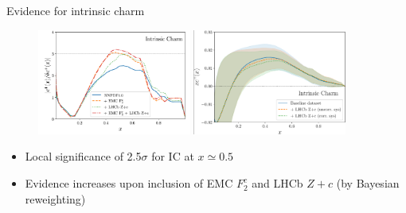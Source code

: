 \documentclass[aspectratio=43, 8pt,t]{beamer}
\begin{document}
\begin{frame}{Evidence for intrinsic charm}
  \begin{figure}
    \includegraphics[width=0.45\textwidth]{ic_f2c_zc.png}
    \includegraphics[width=0.45\textwidth]{lhcb_reweithed.png}
  \end{figure}
  \begin{itemize}
    \item Local significance of 2.5$\sigma$ for IC at $x\simeq 0.5$
    \item Evidence increases upon inclusion of EMC $F_2^c$ and LHCb $Z+c$ (by Bayesian reweighting)
  \end{itemize}
\end{frame}
\end{document}
